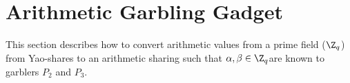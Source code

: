 \section{Arithmetic Garbling Gadget}

This section describes how to convert arithmetic values from a prime field ($\Z_q$) from Yao-shares to an arithmetic sharing such that $\alpha , \beta \in \Z_q$are known to garblers $P_2$ and $P_3$.